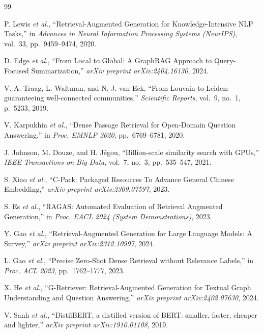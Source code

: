 \documentclass[10pt, conference, a4paper]{IEEEtran}
\begin{document}
\begin{thebibliography}{99}

P. Lewis \textit{et al.},
``Retrieval-Augmented Generation for Knowledge-Intensive NLP Tasks,''
in \textit{Advances in Neural Information Processing Systems (NeurIPS)},
vol.~33, pp.~9459--9474, 2020.

D. Edge \textit{et al.},
``From Local to Global: A GraphRAG Approach to Query-Focused
Summarization,''
\textit{arXiv preprint arXiv:2404.16130}, 2024.

V. A. Traag, L. Waltman, and N. J. van Eck,
``From Louvain to Leiden: guaranteeing well-connected communities,''
\textit{Scientific Reports}, vol.~9, no.~1, p.~5233, 2019.

V. Karpukhin \textit{et al.},
``Dense Passage Retrieval for Open-Domain Question Answering,''
in \textit{Proc. EMNLP 2020}, pp.~6769--6781, 2020.

J. Johnson, M. Douze, and H. J\'{e}gou,
``Billion-scale similarity search with GPUs,''
\textit{IEEE Transactions on Big Data},
vol.~7, no.~3, pp.~535--547, 2021.

S. Xiao \textit{et al.},
``C-Pack: Packaged Resources To Advance General Chinese Embedding,''
\textit{arXiv preprint arXiv:2309.07597}, 2023.

S. Es \textit{et al.},
``RAGAS: Automated Evaluation of Retrieval Augmented Generation,''
in \textit{Proc. EACL 2024 (System Demonstrations)}, 2023.

Y. Gao \textit{et al.},
``Retrieval-Augmented Generation for Large Language Models: A Survey,''
\textit{arXiv preprint arXiv:2312.10997}, 2024.

L. Gao \textit{et al.},
``Precise Zero-Shot Dense Retrieval without Relevance Labels,''
in \textit{Proc. ACL 2023}, pp.~1762--1777, 2023.

X. He \textit{et al.},
``G-Retriever: Retrieval-Augmented Generation for Textual Graph
Understanding and Question Answering,''
\textit{arXiv preprint arXiv:2402.07630}, 2024.

V. Sanh \textit{et al.},
``DistilBERT, a distilled version of BERT: smaller, faster, cheaper
and lighter,''
\textit{arXiv preprint arXiv:1910.01108}, 2019.


\end{thebibliography}
\end{document}
